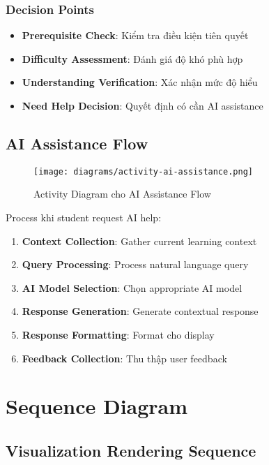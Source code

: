 \subsubsection{Decision Points}

\begin{itemize}
    \item \textbf{Prerequisite Check}: Kiểm tra điều kiện tiên quyết
    \item \textbf{Difficulty Assessment}: Đánh giá độ khó phù hợp
    \item \textbf{Understanding Verification}: Xác nhận mức độ hiểu
    \item \textbf{Need Help Decision}: Quyết định có cần AI assistance
\end{itemize}

\subsection{AI Assistance Flow}
\label{subsec:ai-flow}

\begin{figure}[H]
\centering
\texttt{[image: diagrams/activity-ai-assistance.png]}
\caption{Activity Diagram cho AI Assistance Flow}
\label{fig:activity-ai}
\end{figure}

Process khi student request AI help:

\begin{enumerate}
    \item \textbf{Context Collection}: Gather current learning context
    \item \textbf{Query Processing}: Process natural language query
    \item \textbf{AI Model Selection}: Chọn appropriate AI model
    \item \textbf{Response Generation}: Generate contextual response
    \item \textbf{Response Formatting}: Format cho display
    \item \textbf{Feedback Collection}: Thu thập user feedback
\end{enumerate}

\section{Sequence Diagram}
\label{sec:sequence-diagram}

\subsection{Visualization Rendering Sequence}
\label{subsec:visualization-sequence}

